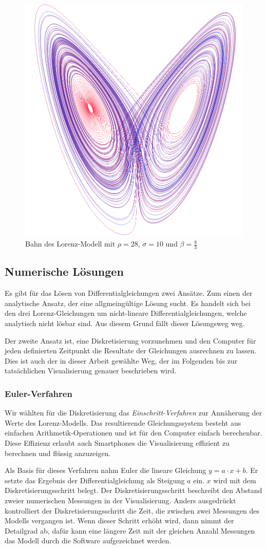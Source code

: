 \begin{figure}
	\centering
	\includegraphics[width=0.3\linewidth]{lorenz/assets/lorenz-modell/lorenz-modell}
	\caption{Bahn des Lorenz-Modell mit $\rho = 28$, $\sigma = 10$ und $\beta = \frac{8}{3}$}
	\label{fig:lorenz-modell}
\end{figure}


\subsection{Numerische Lösungen}
Es gibt für das Lösen von Differentialgleichungen zwei Ansätze. Zum einen der analytische Ansatz, der eine allgmeingültige Lösung sucht. Es handelt sich bei den drei Lorenz-Gleichungen um nicht-lineare Differentialgleichungen, welche analytisch nicht lösbar sind. Aus diesem Grund fällt dieser Lösungsweg weg. 

Der zweite Ansatz ist, eine Diskretisierung vorzunehmen und den Computer für jeden definierten Zeitpunkt die Resultate der Gleichungen ausrechnen zu lassen. Dies ist auch der in dieser Arbeit gewählte Weg, der im Folgenden bis zur tatsächlichen Visualisierung genauer beschrieben wird. 

\subsubsection{Euler-Verfahren}

Wir wählten für die Diskretisierung das \textit{Einschritt-Verfahren} zur Annäherung der Werte des Lorenz-Modells. Das resultierende Gleichungssystem besteht aus einfachen Arithmetik-Operationen und ist für den Computer einfach berechenbar. Diese Effizienz erlaubt auch Smartphones die Visualisierung effizient zu berechnen und flüssig anzuzeigen.

Als Basis für dieses Verfahren nahm Euler die lineare Gleichung $ y = a \cdot x + b $. Er setzte das Ergebnis der Differentialgleichung als Steigung $ a $ ein. $x$ wird mit dem Diskretisierungsschritt belegt. Der Diskretisierungsschritt beschreibt den Abstand zweier numerischen Messungen in der Visualisierung. Anders ausgedrückt kontrolliert der Diskretisierungsschritt die Zeit, die zwischen zwei Messungen des Modells vergangen ist. Wenn dieser Schritt erhöht wird, dann nimmt der Detailgrad ab, dafür kann eine längere Zeit mit der gleichen Anzahl Messungen das Modell durch die Software aufgezeichnet werden.

